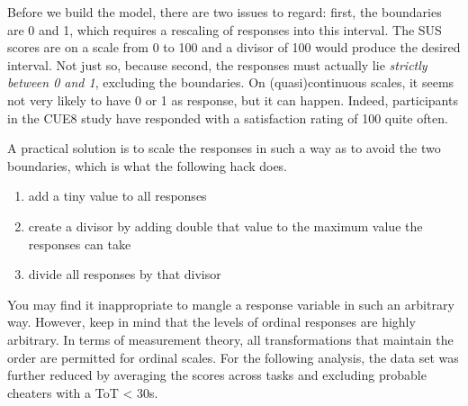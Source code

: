 \documentclass[]{svmono}
\providecommand{\tightlist}{%
  \setlength{\itemsep}{0pt}\setlength{\parskip}{0pt}}
\theoremstyle{definition}
\theoremstyle{definition}
\theoremstyle{definition}
\theoremstyle{remark}
\begin{document}
Before we build the model, there are two issues to regard: first, the
boundaries are 0 and 1, which requires a rescaling of responses into
this interval. The SUS scores are on a scale from 0 to 100 and a divisor
of 100 would produce the desired interval. Not just so, because second,
the responses must actually lie \emph{strictly between 0 and 1},
excluding the boundaries. On (quasi)continuous scales, it seems not very
likely to have 0 or 1 as response, but it can happen. Indeed,
participants in the CUE8 study have responded with a satisfaction rating
of 100 quite often.

A practical solution is to scale the responses in such a way as to avoid
the two boundaries, which is what the following hack does.

\begin{enumerate}
\def\labelenumi{\arabic{enumi}.}
\tightlist
\item
  add a tiny value to all responses
\item
  create a divisor by adding double that value to the maximum value the
  responses can take
\item
  divide all responses by that divisor
\end{enumerate}

You may find it inappropriate to mangle a response variable in such an
arbitrary way. However, keep in mind that the levels of ordinal
responses are highly arbitrary. In terms of measurement theory, all
transformations that maintain the order are permitted for ordinal
scales. For the following analysis, the data set was further reduced by
averaging the scores across tasks and excluding probable cheaters with a
ToT \textless{} 30s.
\end{document}
